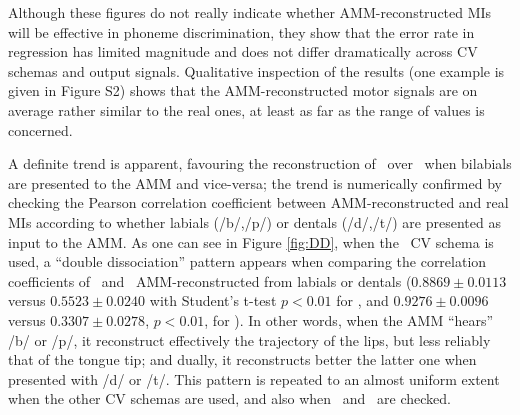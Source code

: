 Although these figures do not really indicate whether AMM-reconstructed MIs will be
effective in phoneme discrimination, they show that the error rate in regression has
limited magnitude and does not differ dramatically across CV schemas and output signals.
Qualitative inspection of the results (one example is given in Figure S2) shows that 
the AMM-reconstructed motor signals are on average rather similar to the real ones,
 at least as far as the range of values is concerned.


A definite trend is apparent, favouring the reconstruction of \vlio\ over \vttu\ when
bilabials are presented to the AMM and vice-versa; the trend is numerically confirmed
by checking the Pearson correlation coefficient between AMM-reconstructed and real MIs
according to whether labials (/b/,/p/) or dentals (/d/,/t/) are presented as input
to the AMM. As one can see in Figure \ref{fig:DD}, when the \overall\ CV schema is used,
a ``double dissociation'' pattern appears when comparing the correlation coefficients of
\vlio\ and \vttu\ AMM-reconstructed from labials or dentals
($0.8869 \pm 0.0113$ versus $0.5523 \pm 0.0240$ with Student's t-test $p<0.01$ for \vlio, and
 $0.9276 \pm 0.0096$ versus $0.3307 \pm 0.0278$, $p<0.01$, for \vttu).
In other words, when the AMM ``hears'' /b/ or /p/, it reconstruct effectively the trajectory of the lips,
but less reliably that of the tongue tip; and dually, it reconstructs better the latter one when
presented with /d/ or /t/. This pattern is repeated to an almost uniform extent when the
other CV schemas are used, and also when \alio\ and \attu\ are checked.
